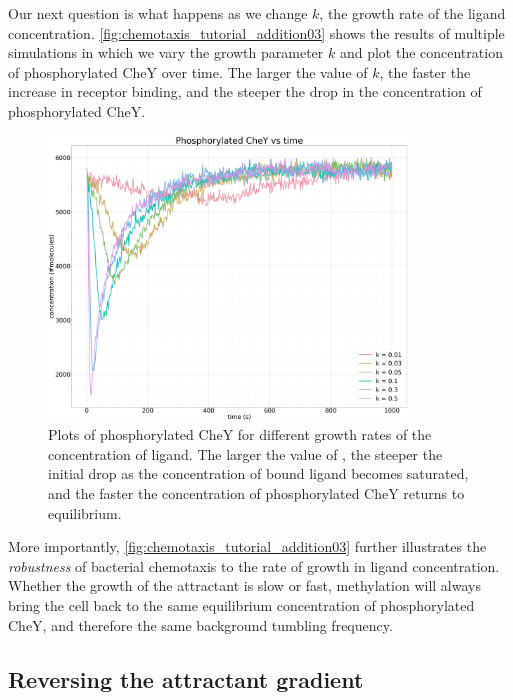 Our next question is what happens as we change $k$, the growth rate of the ligand concentration. \autoref{fig:chemotaxis_tutorial_addition03} shows the results of multiple simulations in which we vary the growth parameter $k$ and plot the concentration of phosphorylated CheY over time. The larger the value of $k$, the faster the increase in receptor binding, and the steeper the drop in the concentration of phosphorylated CheY.\\

\begin{figure}[h]
\centering
\mySfFamily
\includegraphics[width = 0.85\textwidth]{../images/chemotaxis_tutorial_addition03.png}
\caption{Plots of phosphorylated CheY for different growth rates  of the concentration of ligand. The larger the value of , the steeper the initial drop as the concentration of bound ligand becomes saturated, and the faster the concentration of phosphorylated CheY returns to equilibrium.}
\label{fig:chemotaxis_tutorial_addition03}
\end{figure}

More importantly, \autoref{fig:chemotaxis_tutorial_addition03} further illustrates the \textit{robustness} of bacterial chemotaxis to the rate of growth in ligand concentration. Whether the growth of the attractant is slow or fast, methylation will always bring the cell back to the same equilibrium concentration of phosphorylated CheY, and therefore the same background tumbling frequency.

\FloatBarrier
{}
\subsection{Reversing the attractant gradient}

